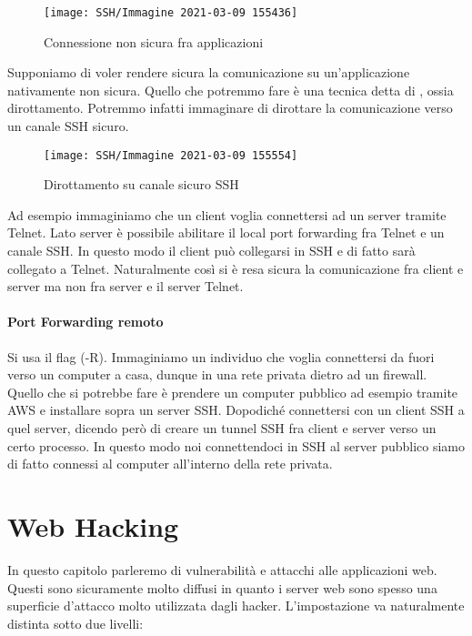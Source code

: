 \documentclass[14pt]{extreport}
\begin{document}
\begin{figure}[H]
    \centering
    \texttt{[image: SSH/Immagine 2021-03-09 155436]}
    \caption{Connessione non sicura fra applicazioni}
\end{figure}


Supponiamo di voler rendere sicura la comunicazione su un'applicazione nativamente non sicura. Quello che potremmo fare è una tecnica detta di , ossia dirottamento. Potremmo infatti immaginare di dirottare la comunicazione verso un canale SSH sicuro.

\begin{figure}[H]
    \centering
    \texttt{[image: SSH/Immagine 2021-03-09 155554]}
    \caption{Dirottamento su canale sicuro SSH}
\end{figure}


Ad esempio immaginiamo che un client voglia connettersi ad un server tramite Telnet. Lato server è possibile abilitare il local port forwarding fra Telnet e un canale SSH. In questo modo il client può collegarsi in SSH e di fatto sarà collegato a Telnet. Naturalmente così si è resa sicura la comunicazione fra client e server ma non fra server e il server Telnet.




\subsubsection{Port Forwarding remoto}
Si usa il flag (-R).
Immaginiamo un individuo che voglia connettersi da fuori verso un computer a casa, dunque in una rete privata dietro ad un firewall. Quello che si potrebbe fare è prendere un computer pubblico ad esempio tramite AWS e installare sopra un server SSH. Dopodiché connettersi con un client SSH a quel server, dicendo però di creare un tunnel SSH fra client e server verso un certo processo. In questo modo noi connettendoci in SSH al server pubblico siamo di fatto connessi al computer all'interno della rete privata.






\chapter{Web Hacking}
In questo capitolo parleremo di vulnerabilità e attacchi alle applicazioni web. Questi sono sicuramente molto diffusi in quanto i server web sono spesso una superficie d'attacco molto utilizzata dagli hacker. L'impostazione va naturalmente distinta sotto due livelli:
\end{document}

